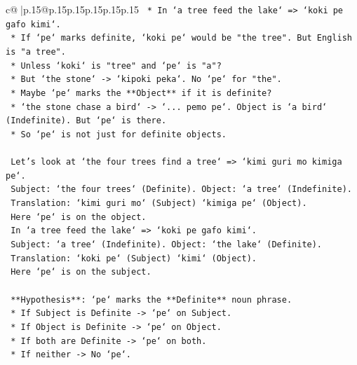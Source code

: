 \documentclass{article}
\begin{document}
{\begin{supertabular}{c@{$\;$}|p{.15\linewidth}@{}p{.15\linewidth}p{.15\linewidth}p{.15\linewidth}p{.15\linewidth}p{.15\linewidth}}
{{{\texttt{                        *   In `a tree feed the lake` => `koki pe gafo kimi`.} \\
\texttt{                        *   If `pe` marks definite, `koki pe` would be "the tree". But English is "a tree".} \\
\texttt{                        *   Unless `koki` is "tree" and `pe` is "a"?} \\
\texttt{                        *   But `the stone` {-}> `kipoki peka`. No `pe` for "the".} \\
\texttt{                        *   Maybe `pe` marks the **Object** if it is definite?} \\
\texttt{                        *   `the stone chase a bird` {-}> `... pemo pe`. Object is `a bird` (Indefinite). But `pe` is there.} \\
\texttt{                        *   So `pe` is not just for definite objects.} \\
\\ 
\texttt{                    Let's look at `the four trees find a tree` => `kimi guri mo kimiga pe`.} \\
\texttt{                    Subject: `the four trees` (Definite). Object: `a tree` (Indefinite).} \\
\texttt{                    Translation: `kimi guri mo` (Subject) `kimiga pe` (Object).} \\
\texttt{                    Here `pe` is on the object.} \\
\texttt{                    In `a tree feed the lake` => `koki pe gafo kimi`.} \\
\texttt{                    Subject: `a tree` (Indefinite). Object: `the lake` (Definite).} \\
\texttt{                    Translation: `koki pe` (Subject) `kimi` (Object).} \\
\texttt{                    Here `pe` is on the subject.} \\
\\ 
\texttt{                    **Hypothesis**: `pe` marks the **Definite** noun phrase.} \\
\texttt{                    *   If Subject is Definite {-}> `pe` on Subject.} \\
\texttt{                    *   If Object is Definite {-}> `pe` on Object.} \\
\texttt{                    *   If both are Definite {-}> `pe` on both.} \\
\texttt{                    *   If neither {-}> No `pe`.} \\
}}}
\end{supertabular}}
\end{document}

